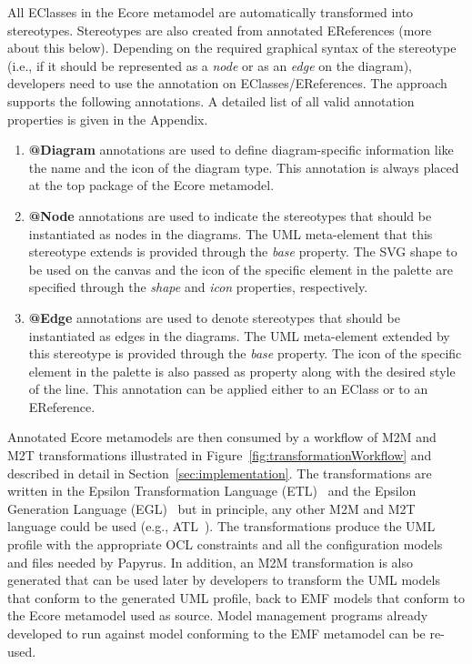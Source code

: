 All EClasses in the Ecore metamodel are automatically transformed into stereotypes. 
Stereotypes are also created from annotated EReferences (more about this below). 
Depending on the required graphical syntax of the stereotype (i.e., if it should be represented as a \textit{node} or as an \textit{edge} on the diagram), developers need to use the annotation on EClasses/EReferences. 
The approach supports the following annotations. 
A detailed list of all valid annotation properties is given in the Appendix. 

\begin{enumerate}[label=\arabic*.]
	\item \textbf{@Diagram} annotations are used to define diagram-specific 
	information like the name and the icon of the diagram type. This annotation 
	is always placed at the top package of the Ecore metamodel.
	\item \textbf{@Node} annotations are used to indicate the stereotypes that 
	should be instantiated as nodes in the diagrams. The UML meta-element that 
	this stereotype extends is provided through the \emph{base} property. The 
	SVG shape to be used on the canvas and the icon of the specific element in 
	the palette are specified through the \emph{shape} and \emph{icon} 
	properties, respectively.
	\item \textbf{@Edge} annotations are used to denote stereotypes that should be instantiated as edges in the diagrams. The UML meta-element extended by this stereotype is provided through the \emph{base} property. The icon of the specific element in the palette is also passed as property along with the desired style of the line. This annotation can be applied either to an EClass or to an EReference.
\end{enumerate}

Annotated Ecore metamodels are then consumed by a workflow of M2M and M2T 
transformations illustrated in Figure~\ref{fig:transformationWorkflow} and 
described in detail in Section~\ref{sec:implementation}. The transformations 
are written in the Epsilon Transformation Language (ETL)~\cite{Kolovos2008} and 
the Epsilon Generation Language (EGL)~\cite{rose2008egl} but in principle, any 
other M2M and M2T language could be used (e.g., ATL~\cite{jouault2006atl}). The 
transformations produce the UML 
profile with the appropriate OCL constraints and all the configuration models 
and files needed by Papyrus. In addition, an M2M transformation is also generated that can be used 
later by developers to transform the UML models that conform to the generated 
UML profile, back to EMF models that conform to the Ecore metamodel used as 
source. Model management programs already developed to run against model 
conforming to the EMF metamodel can be re-used.

